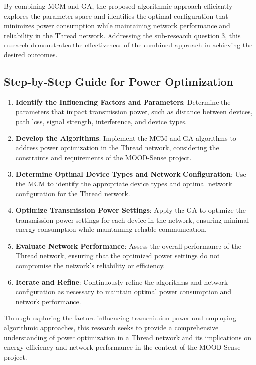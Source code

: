 By combining \gls{MCM} and \gls{GA}, the proposed algorithmic approach efficiently explores the parameter space and identifies the optimal configuration that minimizes power consumption while maintaining network performance and reliability in the Thread network. Addressing the sub-research question 3, this research demonstrates the effectiveness of the combined approach in achieving the desired outcomes.


\subsection{Step-by-Step Guide for Power Optimization}

\begin{enumerate}
    \item \textbf{Identify the Influencing Factors and Parameters}: Determine the parameters that impact transmission power, such as distance between devices, path loss, signal strength, interference, and device types.
    \item \textbf{Develop the Algorithms}: Implement the \gls{MCM} and \gls{GA} algorithms to address power optimization in the Thread network, considering the constraints and requirements of the MOOD-Sense project.
    \item \textbf{Determine Optimal Device Types and Network Configuration}: Use the \gls{MCM} to identify the appropriate device types and optimal network configuration for the Thread network.
    \item \textbf{Optimize Transmission Power Settings}: Apply the \gls{GA} to optimize the transmission power settings for each device in the network, ensuring minimal energy consumption while maintaining reliable communication.
    \item \textbf{Evaluate Network Performance}: Assess the overall performance of the Thread network, ensuring that the optimized power settings do not compromise the network's reliability or efficiency.
    \item \textbf{Iterate and Refine}: Continuously refine the algorithms and network configuration as necessary to maintain optimal power consumption and network performance.
\end{enumerate}

Through exploring the factors influencing transmission power and employing algorithmic approaches, this research seeks to provide a comprehensive understanding of power optimization in a Thread network and its implications on energy efficiency and network performance in the context of the MOOD-Sense project.


